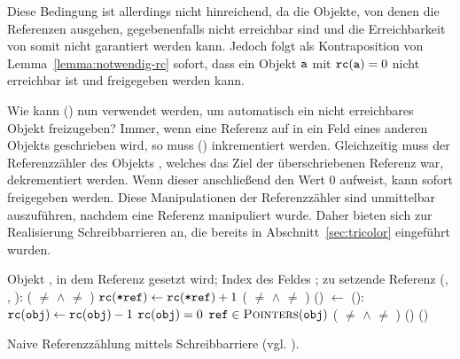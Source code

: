 Diese Bedingung ist allerdings nicht hinreichend, da die Objekte, von denen die Referenzen ausgehen, gegebenenfalls nicht erreichbar sind und die Erreichbarkeit von  somit nicht garantiert werden kann.
Jedoch folgt als Kontraposition von Lemma~\ref{lemma:notwendig-rc} sofort, dass ein Objekt $\texttt{a}$ mit $\texttt{rc}(\texttt{a}) = 0$ nicht erreichbar ist und freigegeben werden kann.

Wie kann () nun verwendet werden, um automatisch ein nicht erreichbares Objekt freizugeben?
Immer, wenn eine Referenz auf  in ein Feld eines anderen Objekts geschrieben wird, so muss () inkrementiert werden.
Gleichzeitig muss der Referenzzähler des Objekts , welches das Ziel der überschriebenen Referenz war, dekrementiert werden.
Wenn dieser anschließend den Wert $0$ aufweist, kann  sofort freigegeben werden.
Diese Manipulationen der Referenzzähler sind unmittelbar auszuführen, nachdem eine Referenz manipuliert wurde.
Daher bieten sich zur Realisierung Schreibbarrieren an, die bereits in Abschnitt~\ref{sec:tricolor} eingeführt wurden.

\begin{algorithm}[h]
\begin{algorithmic}[1]
	\Input Objekt , in dem Referenz gesetzt wird; Index des Feldes ; zu setzende Referenz 
	\State \Atomic {}(, , ):
	\State \quad \IF ( $\neq$ \Null $\wedge$  $\neq$ )	
	\State \quad \quad $\texttt{rc}(\texttt{*ref}) \gets \texttt{rc}(\texttt{*ref}) + 1$ 
	\State \quad \IF ( $\neq$ \Null $\wedge$  $\neq$ )	
	\State \quad \quad {}()	
	\State \quad {} $\gets$ 
	\Statex
	\State {}():
	\State \quad $\texttt{rc}(\texttt{obj}) \gets \texttt{rc}(\texttt{obj}) - 1$
	\State \quad \IF $\texttt{rc}(\texttt{obj}) = 0$
	\State \quad \quad \FOREACH $\texttt{ref} \in \textsc{Pointers}(\texttt{obj})$
	\State \quad \quad \quad \IF ( $\neq$ \Null $\wedge$  $\neq$ ) 
	\State \quad \quad \quad \quad {}() 
	\State \quad \quad {}()
\end{algorithmic}
\caption[Naive Referenzzählung]{Naive Referenzzählung mittels Schreibbarriere (vgl. \cite[S. 58]{handbook}).}
\label{algo:naive-rc}
\end{algorithm}

